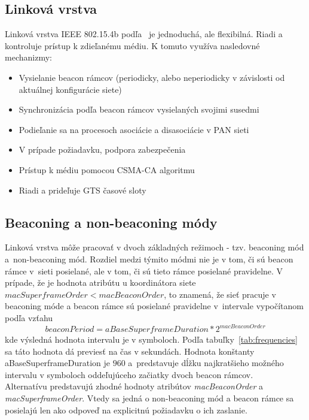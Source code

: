 \subsection{Linková vrstva}
\indent\indent Linková vrstva IEEE 802.15.4b podľa~\cite{ieee06} je jednoduchá, ale flexibilná. Riadi a kontroluje prístup k zdieľanému médiu. K tomuto využíva nasledovné mechanizmy:
\begin{itemize}
\item Vysielanie beacon rámcov (periodicky, alebo neperiodicky v závislosti od aktuálnej konfigurácie siete)
\item Synchronizácia podľa beacon rámcov vysielaných svojimi susedmi
\item Podieľanie sa na procesoch asociácie a disasociácie v PAN sieti
\item V prípade požiadavku, podpora zabezpečenia
\item Prístup k médiu pomocou CSMA-CA algoritmu
\item Riadi a prideľuje GTS časové sloty 
\end{itemize}
\subsection{Beaconing a non-beaconing módy}
\indent\indent  Linková vrstva môže pracovať v dvoch základných režimoch - tzv. beaconing mód a~non-beaconing mód. Rozdiel medzi týmito módmi nie je v tom, či sú beacon rámce v~sieti posielané, ale v tom, či sú tieto rámce posielané pravidelne. V prípade, že je hodnota atribútu u koordinátora siete $macSuperframeOrder < macBeaconOrder$, to znamená, že sieť pracuje v beaconing móde a beacon rámce sú posielané pravidelne v~intervale vypočítanom podľa vzťahu 
$$ beaconPeriod = aBaseSuperframeDuration * 2^{macBeaconOrder}$$
kde výsledná hodnota intervalu je v symboloch. Podľa tabuľky~\ref{tab:frequencies} sa táto hodnota dá previesť na čas v sekundách. Hodnota konštanty aBaseSuperframeDuration je $960$ a~predstavuje dĺžku najkratšieho možného intervalu v symboloch oddeľujúceho začiatky dvoch beacon rámcov.\\
\indent Alternatívu predstavujú zhodné hodnoty atribútov \textit{macBeaconOrder} a \textit{macSuperframeOrder}. Vtedy sa jedná o non-beaconing mód a beacon rámce sa posielajú len ako odpoveď na explicitnú požiadavku o ich zaslanie.\\
